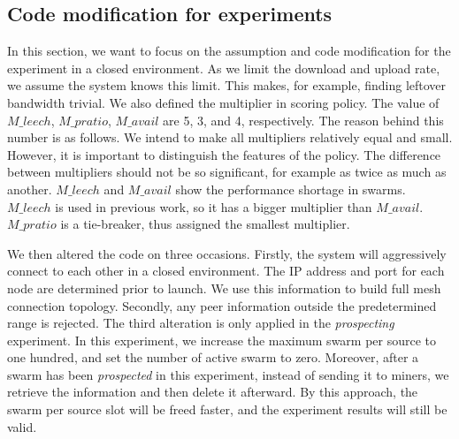 %

\subsection{Code modification for experiments}
\label{section:predlsetup}
In this section, we want to focus on the assumption and code modification for the experiment in a closed environment. As we limit the download and upload rate, we assume the system knows this limit. This makes, for example, finding leftover bandwidth trivial. We also defined the multiplier in scoring policy. The value of $M\_leech$, $M\_pratio$, $M\_avail$ are 5, 3, and 4, respectively. The reason behind this number is as follows. We intend to make all multipliers relatively equal and small. However, it is important to distinguish the features of the policy. The difference between multipliers should not be so significant, for example as twice as much as another. $M\_leech$ and $M\_avail$ show the performance shortage in swarms. $M\_leech$ is used in previous work, so it has a bigger multiplier than $M\_avail$. $M\_pratio$ is a tie-breaker, thus assigned the smallest multiplier.

We then altered the code on three occasions. Firstly, the system will aggressively connect to each other in a closed environment. The IP address and port for each node are determined prior to launch. We use this information to build full mesh connection topology. Secondly, any peer information outside the predetermined range is rejected. The third alteration is only applied in the \textit{prospecting} experiment. In this experiment, we increase the maximum swarm per source to one hundred, and set the number of active swarm to zero. Moreover, after a swarm has been \textit{prospected} in this experiment, instead of sending it to miners, we retrieve the information and then delete it afterward. By this approach, the swarm per source slot will be freed faster, and the experiment results will still be valid. 


